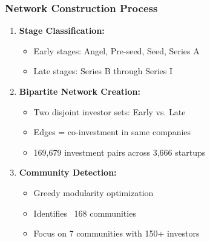 \begin{frame}
\frametitle{Network Construction Process}

\begin{enumerate}
    \item \textbf{Stage Classification:}
    \begin{itemize}
        \item Early stages: Angel, Pre-seed, Seed, Series A
        \item Late stages: Series B through Series I
    \end{itemize}
    \vspace{0.3cm}

    \item \textbf{Bipartite Network Creation:}
    \begin{itemize}
        \item Two disjoint investor sets: Early vs. Late
        \item Edges = co-investment in same companies
        \item 169,679 investment pairs across 3,666 startups
    \end{itemize}
    \vspace{0.3cm}
    
    \item \textbf{Community Detection:}
    \begin{itemize}
        \item Greedy modularity optimization
        \item Identifies ~168 communities
        \item Focus on 7 communities with 150+ investors
    \end{itemize}
\end{enumerate}

\end{frame}

